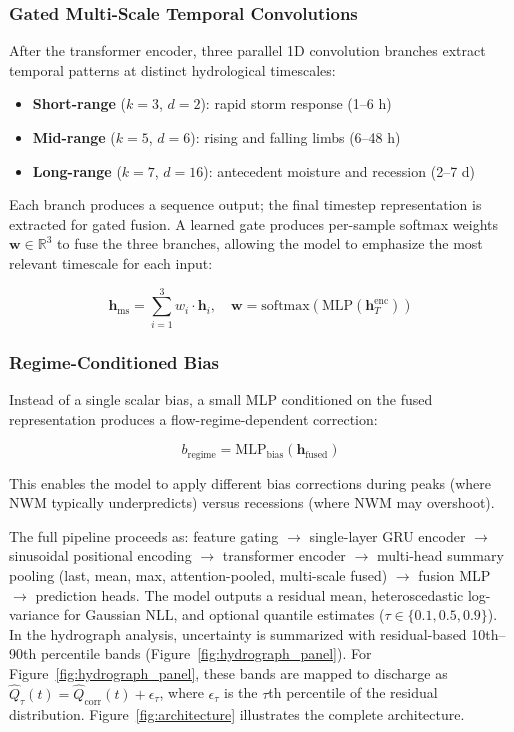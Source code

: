 \documentclass[draft]{agujournal2019}
\begin{document}
\subsubsection*{Gated Multi-Scale Temporal Convolutions}
After the transformer encoder, three parallel 1D convolution branches extract temporal patterns at distinct hydrological timescales:
\begin{itemize}
    \item \textbf{Short-range} ($k{=}3$, $d{=}2$): rapid storm response (1--6 h)
    \item \textbf{Mid-range} ($k{=}5$, $d{=}6$): rising and falling limbs (6--48 h)
    \item \textbf{Long-range} ($k{=}7$, $d{=}16$): antecedent moisture and recession (2--7 d)
\end{itemize}
Each branch produces a sequence output; the final timestep representation is extracted for gated fusion. A learned gate produces per-sample softmax weights $\mathbf{w} \in \mathbb{R}^3$ to fuse the three branches, allowing the model to emphasize the most relevant timescale for each input:
\begin{linenomath*}
\begin{equation}
    \mathbf{h}_{\text{ms}} = \sum_{i=1}^{3} w_i \cdot \mathbf{h}_i, \quad \mathbf{w} = \text{softmax}(\text{MLP}(\mathbf{h}_T^{\text{enc}}))
\end{equation}
\end{linenomath*}

\subsubsection*{Regime-Conditioned Bias}
Instead of a single scalar bias, a small MLP conditioned on the fused representation produces a flow-regime-dependent correction:
\begin{linenomath*}
\begin{equation}
    b_{\text{regime}} = \text{MLP}_{\text{bias}}(\mathbf{h}_{\text{fused}})
\end{equation}
\end{linenomath*}
This enables the model to apply different bias corrections during peaks (where NWM typically underpredicts) versus recessions (where NWM may overshoot).

The full pipeline proceeds as: feature gating $\to$ single-layer GRU encoder $\to$ sinusoidal positional encoding $\to$ transformer encoder $\to$ multi-head summary pooling (last, mean, max, attention-pooled, multi-scale fused) $\to$ fusion MLP $\to$ prediction heads. The model outputs a residual mean, heteroscedastic log-variance for Gaussian NLL, and optional quantile estimates ($\tau \in \{0.1, 0.5, 0.9\}$). In the hydrograph analysis, uncertainty is summarized with residual-based 10th--90th percentile bands (Figure~\ref{fig:hydrograph_panel}). For Figure~\ref{fig:hydrograph_panel}, these bands are mapped to discharge as $\hat{Q}_{\tau}(t)=\hat{Q}_{\mathrm{corr}}(t)+\epsilon_{\tau}$, where $\epsilon_{\tau}$ is the $\tau$th percentile of the residual distribution. Figure~\ref{fig:architecture} illustrates the complete architecture.
\end{document}
